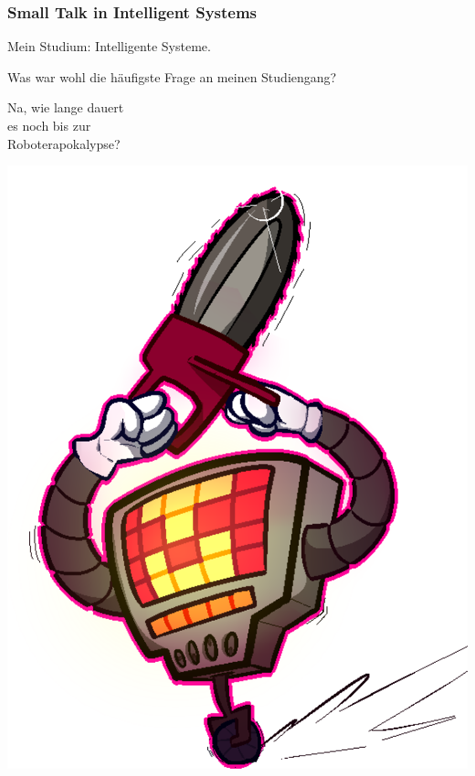 \documentclass[aspectratio=169,x11names]{beamer}
\begin{document}

\begin{frame}
\frametitle{Small Talk in Intelligent Systems}

\begin{multicols}{2}

Mein Studium: \glqq Intelligente Systeme\grqq .

Was war wohl die häufigste Frage an meinen Studiengang?

\pause

\begin{center}
\glqq Na, wie lange dauert\\ es noch bis zur\\ Roboterapokalypse?\grqq
\end{center}

\columnbreak

\begin{center}
\includegraphics[height=0.7\textheight,keepaspectratio]{images/mtt.png} 
\end{center}
\end{multicols}
\end{frame}
\end{document}
